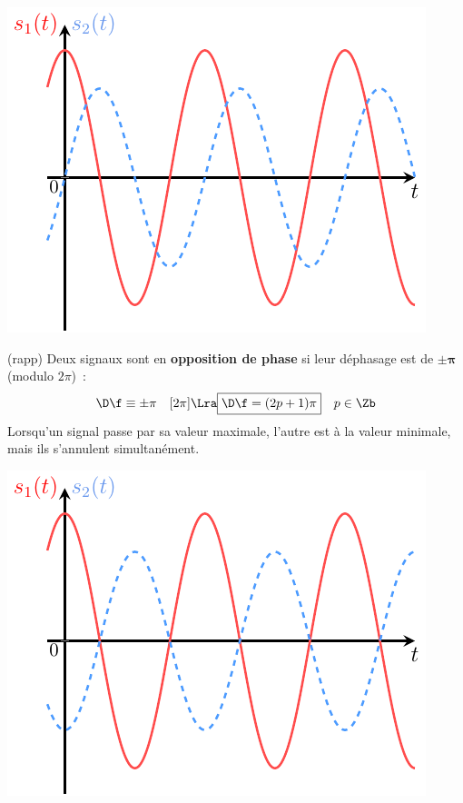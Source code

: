 \documentclass[../../main/main.tex]{subfiles}
\begin{document}
\begin{tcb}[breakable]
\begin{isd}[righthand ratio=.3, interior hidden]
\begin{center}
			\includegraphics[width=\linewidth]{dfeqpi2.pdf}
			\captionsetup{justification=centering}
		\end{center}
	\end{isd}
	\vspace{-15pt}
	\begin{isd}[righthand ratio=.3, interior hidden](rapp)
		Deux signaux sont en \textbf{opposition de phase} si leur déphasage est de
		$\mathbf{\pm\pi}$ (modulo $2\pi$)~:
		\[
			\D\f \equiv \pm\pi \quad[2\pi]
			\Lra
			\boxed{\D\f = (2p+1)\pi}
			\quad p \in \Zb
		\]
		Lorsqu'un signal passe par sa valeur maximale, l'autre est à la valeur
		minimale, mais ils s'annulent simultanément.
		\tcblower
		\begin{center}
			\includegraphics[width=\linewidth]{dfeqpi.pdf}
			\captionsetup{justification=centering}
		\end{center}
	\end{isd}
	\vspace{-10pt}
\end{tcb}
\end{document}

